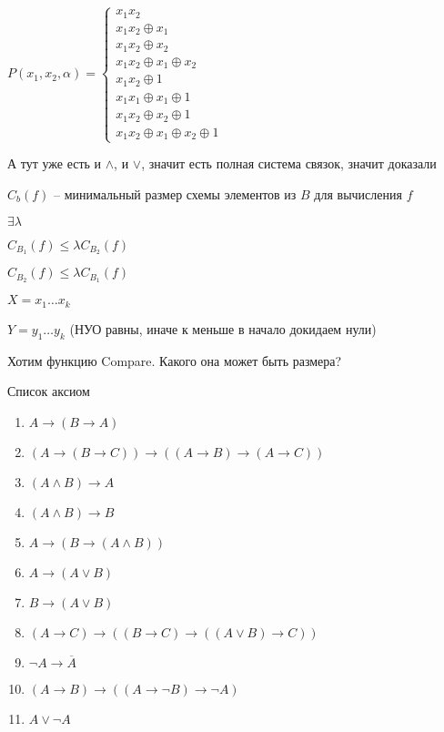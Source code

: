 \documentclass[12pt]{article}
\begin{document}
$P(x_1, x_2, \alpha) = \begin{cases}
    x_1x_2 \\
    x_1x_2 \oplus x_1 \\
    x_1x_2 \oplus x_2 \\
    x_1x_2 \oplus x_1 \oplus x_2 \\
    x_1x_2 \oplus 1 \\
    x_1x_1 \oplus x_1 \oplus 1 \\
    x_1x_2 \oplus x_2 \oplus 1 \\
    x_1x_2 \oplus x_1 \oplus x_2 \oplus 1
\end{cases}$

А тут уже есть и $\land$, и $\lor$, значит есть полная система связок, значит доказали

\begin{defin}{}
    $C_b(f)$ -- минимальный размер схемы элементов из $B$ для вычисления $f$
\end{defin}

\begin{Remark}{}
    $\exists \lambda$

    $C_{B_1}(f) \leq \lambda C_{B_2}(f)$

    $C_{B_2}(f) \leq \lambda C_{B_1}(f)$
\end{Remark}

\begin{nota}{}
    $X = x_1 \ldots x_k$

    $Y = y_1 \ldots y_k$ (НУО равны, иначе к меньше в начало докидаем нули)

    Хотим функцию Compare. Какого она может быть размера?
\end{nota}

\begin{theo}{Список аксиом}
    \begin{enumerate}
        \item $A \to (B \to A)$
        \item $(A \to (B \to C)) \to ((A \to B) \to (A \to C))$
        \item $(A \land B) \to A$
        \item $(A \land B) \to B$
        \item $A \to (B \to (A \land B))$
        \item $A \to (A \lor B)$
        \item $B \to (A \lor B)$
        \item $(A \to C) \to ((B \to C) \to ((A \lor B) \to C))$
        \item $\neg A \to \overline{A}$
        \item $(A \to B) \to ((A \to \neg B) \to \neg A)$
        \item $A \lor \neg A$
    \end{enumerate}
\end{theo}
\end{document}

